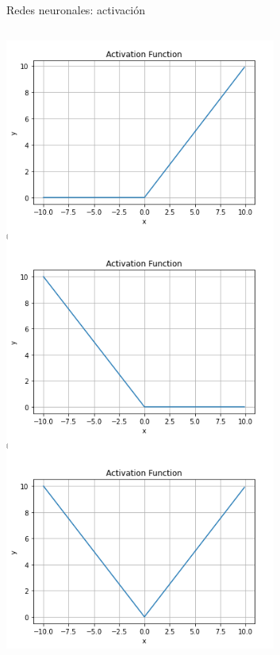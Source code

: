 \begin{frame}{Redes neuronales: activación}
\begin{columns}[c]
\begin{column}{0.3\textwidth}
    \includegraphics[width=\textwidth]{Slides/figures/Introduccion/combinolineal.png}
\end{column}
\end{columns}
\end{frame}


